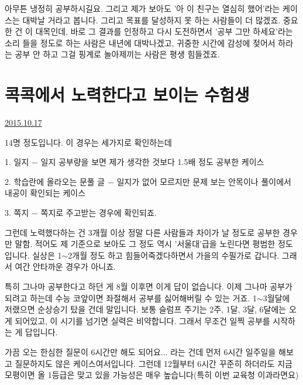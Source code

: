 아무튼 냉정히 공부하시길요. 그리고 제가 보아도 '아 이 친구는 열심히 했어'라는 케이스는 대박날 거라고 봅니다.
그리고 목표를 달성하지 못 하는 사람들이 더 많겠죠.
중요한 건 이 대목인데, 바로 그 결과를 인정하고 다시 도전하면서 '공부 그만 하세요'라는 소리 들을 정도로 하는 사람은 내년에 대박나겠고,
귀중한 시간에 감성에 젖어서 하라는 공부 안 하고 그걸 핑계로 놀아제끼는 사람은 평생 힘들겠죠.
\vspace{5mm}










\section{콕콕에서 노력한다고 보이는 수험생}
\href{https://www.kockoc.com/Apoc/420994}{2015.10.17}

\vspace{5mm}

14명 정도입니다.
이 경우는 세가지로 확인하는데
\vspace{5mm}

\item 1. 일지 $-$ 일지 공부량을 보면 제가 생각한 것보다 1.5배 정도 공부한 케이스
\item 2. 학습란에 올라오는 문풀 글 $-$ 일지가 없어 모르지만 문제 보는 안목이나 풀이에서 내공이 확인되는 케이스
\item 3. 쪽지 $-$ 쪽지로 주고받는 경우에 확인되죠.
\vspace{5mm}

그런데 노력했다하는 건 3개월 이상 정말 다른 사람들과 차이가 날 정도로 공부한 경우만 말함.
적어도 제 기준으로 보아도 그 정도 역시 '서울대'급을 노린다면 평범한 정도입니다.
실상은 1$\sim$2개월 정도 하고 힘들어죽겠다하면서 가을의 수필가로 갑니다. 그래서 여간 안타까운 경우가 아니죠.
\vspace{5mm}

특히 그나마 공부한다고 하던 게 8월 이후면 이게 답이 없습니다. 이제 그나마 공부가 되려고 하는데 수능 코앞이면 좌절해서
공부를 싫어해버릴 수 있는 거죠. 1$\sim$3월달에 저랬으면 순상승기 탔을 건데 말입니다.
보통 슬럼프 주기는 2주, 1달, 3달, 6달에는 오게 되어있고, 이 시기를 넘기면 실력은 비약합니다.
그래서 무조건 일찍 공부를 시작하는 게 답입니다.
\vspace{5mm}

가끔 오는 한심한 질문이 6시간만 해도 되어요... 라는 건데 먼저 6시간 일주일을 해보고 질문하지도 않은 케이스여서입니다.
그런데 12월부터 6시간 꾸준히 하더라도 지금 모평이면 올 1등급은 맞고 있을 가능성은 매우 높습니다(특히 이번 교육청 이과라면요)
\vspace{5mm}

